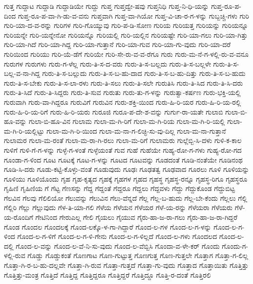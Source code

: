 {ಗುತ್ತ
ಗುದ್ದಾಟ
ಗುದ್ದಾಡಿ
ಗುದ್ದಾಡಿಯೇ
ಗುದ್ದು
ಗುಪ್ತ
ಗುಪ್ತದ್ವೇ-ಷವು
ಗುಪ್ತನಿಧಿ
ಗುಪ್ತ-ನಿ-ಧಿ-ಯನ್ನು
ಗುಪ್ತ-ರೂ-ಪ-ದಿಂದ
ಗುಪ್ತ-ರೂ-ಪ-ವಾ-ಗಿ-ಡು-ವ-ವನು
ಗುಪ್ತವಾಗಿ
ಗುಪ್ತ-ವಾ-ಗಿಯೋ
ಗುಪ್ತ-ವಿ-ಚಾ-ರ-ಗ-ಳನ್ನು
ಗುಬ್ಬಚ್ಚಿ-ಗಳು
ಗುರಿ
ಗುರಿ-ಯಾ-ದ-ವ-ರನ್ನು
ಗುರಿಗಳ
ಗುರಿ-ಗೊಯ್ಯುವು
ಗುರಿ-ಪ-ಡಿ-ಸೋಣ
ಗುರಿಯ
ಗುರಿಯತ್ತ
ಗುರಿಯನ್ನು
ಗುರಿಯನ್ನೂ
ಗುರಿಯನ್ನೇ
ಗುರಿ-ಯನ್ನೇನೋ
ಗುರಿಯನ್ನೊ
ಗುರಿಯಲ್ಲಿ
ಗುರಿ-ಯಲ್ಲಿನ
ಗುರಿಯಷ್ಟೇ
ಗುರಿ-ಯಾ-ಗಲು
ಗುರಿ-ಯಾ-ಗಿತ್ತು
ಗುರಿ-ಯಾ-ಗಿದೆ
ಗುರಿ-ಯಾ-ಗಿದ್ದ
ಗುರಿ-ಯಾ-ಗುತ್ತಾನೆ
ಗುರಿ-ಯಾ-ಗುವ
ಗುರಿ-ಯಾ-ಗು-ವುದು
ಗುರಿ-ಯಾ-ದರೆ
ಗುರಿಯಿಂದ
ಗುರಿಯು
ಗುರಿ-ಯೆ-ಡೆಗೆ
ಗುರಿಯೇ
ಗುರಿ-ಸೇ-ರು-ವ-ವ-ರೆಗೂ
ಗುರು
ಗುರು-ಮ-ನೆ-ಗ-ಳಲ್ಲಿ-ರು-ವ-ವನೂ
ಗುರುಗಳ
ಗುರುಗಳು
ಗುರು-ಗ-ಳೆಲ್ಲ
ಗುರು-ತಿ-ಸ-ದ-ವರು
ಗುರು-ತಿ-ಸ-ಬಲ್ಲದು
ಗುರು-ತಿ-ಸ-ಬಲ್ಲಳೇ
ಗುರು-ತಿ-ಸ-ಬಲ್ಲ-ವ-ನಾ-ಗಿದ್ದ
ಗುರು-ತಿ-ಸ-ಬಲ್ಲುದು
ಗುರು-ತಿ-ಸ-ಬ-ಹು-ದಾದ
ಗುರು-ತಿ-ಸ-ಬ-ಹು-ದಿತ್ತು
ಗುರು-ತಿ-ಸ-ಬ-ಹುದು
ಗುರು-ತಿ-ಸ-ಬೇಕು
ಗುರು-ತಿ-ಸ-ಲಾ-ರಳು
ಗುರು-ತಿ-ಸಲು
ಗುರು-ತಿ-ಸಲೇ
ಗುರುತಿಸಿ
ಗುರು-ತಿ-ಸಿದ
ಗುರು-ತಿ-ಸಿ-ದರು
ಗುರು-ತಿ-ಸಿದೆ
ಗುರು-ತಿ-ಸಿದ್ದರು
ಗುರು-ತಿ-ಸುವ
ಗುರುತು
ಗುರು-ತು-ಗ-ಳನ್ನು
ಗುರುತ್ವಾ-ಕರ್ಷಣ
ಗುರು-ಭಕ್ತಿ-ಯಲ್ಲಿ
ಗುರುವಾಗಿ
ಗುರು-ವಾ-ಗಿದ್ದರೂ
ಗುರುವಿಗೆ
ಗುರುವಿನ
ಗುರು-ಶಕ್ತಿ-ಯಿಂದ
ಗುರು-ಹಿ-ರಿ-ಯರ
ಗುರು-ಹಿ-ರಿ-ಯ-ರಲ್ಲಿ
ಗುರು-ಹಿ-ರಿ-ಯ-ರಿಗೆ
ಗುರು-ಹಿ-ರಿ-ಯರು
ಗುರೂಜಿ
ಗುರೂ-ಪ-ದೇ-ಶ-ವನ್ನು
ಗುರ್ಗು-ರಾ-ಯತೇ
ಗುಲಾಬಿ
ಗುಲಾ-ಬಿ-ಹೂ-ವನ್ನು
ಗುಲಾ-ಬಿ-ಹೂ-ವಿನ
ಗುಲಾಮ
ಗುಲಾ-ಮ-ಗಿ-ರಿಗೆ
ಗುಲಾ-ಮ-ಗಿ-ರಿಯ
ಗುಲಾ-ಮ-ಗಿ-ರಿ-ಯಲ್ಲಿ
ಗುಲಾ-ಮ-ಗಿ-ರಿ-ಯಲ್ಲಿಟ್ಟು
ಗುಲಾ-ಮ-ಗಿ-ರಿ-ಯಿಂದ
ಗುಲಾ-ಮ-ನಾ-ಗ-ಲಿಚ್ಛಿ-ಸು-ವು-ದಿಲ್ಲ
ಗುಲಾ-ಮ-ನಾ-ಗುತ್ತಾನೆ
ಗುಲಾಮರ
ಗುಲಾ-ಮ-ರಂತೆ
ಗುಲಾ-ಮ-ರಾ-ಗಿ-ರಲು
ಗುಲಾ-ಮ-ರಿಗೆ
ಗುಲಾಮರು
ಗುಲ್ಲೆಬ್ಬಿ-ಸಿ-ದಳು
ಗುಳಿ-ಕ-ಕಾಲ
ಗುಳಿಗೆ
ಗುಳಿ-ಗೆ-ಗ-ಳನ್ನು
ಗುಳ್ಳೆ-ಗ-ಳಂತೆ
ಗುಳ್ಳೆಯಂತೆ
ಗುವ
ಗುಹೆ
ಗುಹೆಯೇ
ಗುಹ್ಯ-ರೋ-ಗ-ಗಳು
ಗುಹ್ಯ-ರೋ-ಗದ
ಗೂಂಡಾ-ಗ-ಳಿಂದ
ಗೂಟ
ಗೂಟಕ್ಕೆ
ಗೂಟ-ಗ-ಳನ್ನು
ಗೂಟದ
ಗೂಟವನ್ನು
ಗೂಡದಂತೆ
ಗೂಡಿ-ನಂತೆಯೇ
ಗೂಡಿನಂಥ
ಗೂಡಿ-ಸಿ-ದರು
ಗೂಡು-ಕಟ್ಟಿ-ಕೊಳ್ಳು-ವಂತೆ
ಗೂಡುವುದು
ಗೂಢಃ
ಗೂಢತತ್ವ
ಗೂಢವಾದ
ಗೂರಲು
ಗೂಳಿ
ಗೂಳಿಯನ್ನು
ಗೂಳಿಯು
ಗೂಳಿಯೊಂದು
ಗೃಹ
ಗೃಹ-ಕೃತ್ಯದ
ಗೃಹಕ್ಕೆ
ಗೃಹಗಳ
ಗೃಹದ
ಗೃಹಸ್ಥ
ಗೃಹಸ್ಥ-ರನ್ನೂ
ಗೃಹಸ್ಥ-ರಿಗೂ
ಗೃಹಸ್ಥರೂ
ಗೃಹಿಣಿ
ಗೃಹಿಣಿಯ
ಗೆ
ಗೆಟ್ಟ
ಗೆಣಸನ್ನು
ಗೆದ್ದ
ಗೆದ್ದಂತೆ
ಗೆದ್ದರೂ
ಗೆದ್ದಲು
ಗೆದ್ದವಳು
ಗೆದ್ದು
ಗೆದ್ದುಕೊಂಡ
ಗೆದ್ದುಬಿಟ್ಟ
ಗೆಲವಿನ
ಗೆಲವು
ಗೆಲಿಲಿಯೋ
ಗೆಲುವನ್ನು
ಗೆಲುವಿನ
ಗೆಲು-ವೆನ್ನದೆ
ಗೆಲ್ಲ
ಗೆಲ್ಲ-ಬ-ಹುದು
ಗೆಲ್ಲ-ಬೇ-ಕೆಂದು
ಗೆಲ್ಲಲು
ಗೆಲ್ಲಿ
ಗೆಲ್ಲಿರಿ
ಗೆಲ್ಲು
ಗೆಲ್ಲುವುದು
ಗೆಳ-ತಿ-ಯಾ-ಗಲಿ
ಗೆಳೆಯ
ಗೆಳೆಯನ
ಗೆಳೆಯರ
ಗೆಳೆ-ಯ-ರನ್ನು
ಗೆಳೆಯರಾ
ಗೆಳೆಯರು
ಗೆಳೆ-ಯ-ರೊಂದಿಗೆ
ಗೇಟಿನಿಂದ
ಗೇರುಎಲ್ಲ
ಗೇಲಿ
ಗೈಯಲು
ಗೈಯುವ
ಗೈರು-ಹಾ-ಜ-ರಾ-ಗಲು
ಗೈರು-ಹಾ-ಜ-ರಾ-ಗಿದ್ದರೆ
ಗೊಂಡ
ಗೊಂದಲ
ಗೊಂದಲಕ್ಕೆ
ಗೊಂದ-ಲಕ್ಕೊ-ಳ-ಗಾ-ಗಿದ್ದಾರೆ
ಗೊಂದ-ಲ-ಗಳ
ಗೊಂದ-ಲ-ಗ-ಳನ್ನು
ಗೊಂದ-ಲ-ಗ-ಳಿಂದ
ಗೊಂದ-ಲ-ಗ-ಳಿಗೆ
ಗೊಂದ-ಲ-ಗ-ಳಿ-ಗೇನು
ಗೊಂದ-ಲ-ಗ-ಳಿಲ್ಲದೆ
ಗೊಂದ-ಲ-ಗಳು
ಗೊಂದಲದ
ಗೊಂದ-ಲ-ದಲ್ಲಿ
ಗೊಂದ-ಲ-ವನ್ನು
ಗೊಂದ-ಲ-ವೆ-ನಿ-ಸು-ವುದು
ಗೊಂದ-ಲ-ವೆಬ್ಬಿಸಿ
ಗೊಂದಾ-ವ-ಳೇ-ಕರ್
ಗೊಂದು
ಗೊಂದು-ಗ-ಳಲ್ಲಿ-ರುವ
ಗೊಡ್ಡು
ಗೊಡ್ಡುಕಂತೆ
ಗೊಣಗಾಟ
ಗೊಣ-ಗುಟ್ಟುತ್ತ
ಗೊಣಗುತ್ತ
ಗೊಣ-ಗುತ್ತಲೇ
ಗೊತ್ತಾಗ
ಗೊತ್ತಾ-ಗ-ಲಿಲ್ಲ
ಗೊತ್ತಾ-ಗಿ-ರ-ಬ-ಹು-ದಲ್ಲವೇ
ಗೊತ್ತಾ-ಗಿ-ರುವ
ಗೊತ್ತಾ-ಗುತ್ತದೆ
ಗೊತ್ತಾ-ಗು-ವುದು
ಗೊತ್ತಾದ
ಗೊತ್ತಾಯಿತು
ಗೊತ್ತಿತ್ತು
ಗೊತ್ತಿತ್ತು-ಮಂತ್ರ
ಗೊತ್ತಿದೆ
ಗೊತ್ತಿದ್ದ
ಗೊತ್ತಿದ್ದರೂ
ಗೊತ್ತಿದ್ದರೆ
ಗೊತ್ತಿದ್ದೂ
ಗೊತ್ತಿ-ರ-ದಂತೆ
ಗೊತ್ತಿರಲಿ
}
